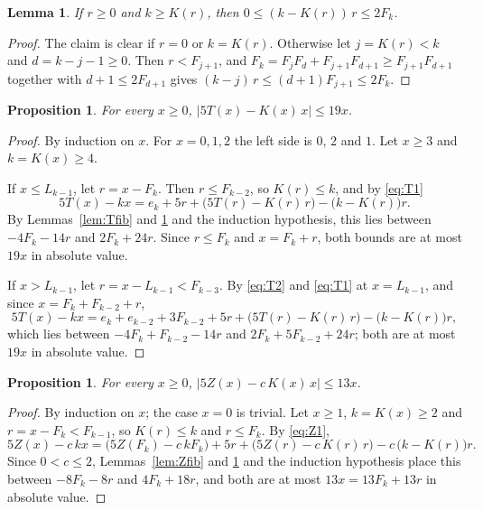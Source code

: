 \documentclass[]{interact}
\theoremstyle{plain}
\numberwithin{equation}{section}
\newtheorem{lemma}[thm]{Lemma}
\newtheorem{proposition}[thm]{Proposition}
\theoremstyle{definition}
\begin{document}
\begin{lemma}\label{lem:gap}
If $r\ge0$ and $k\ge K(r)$, then $0\le (k-K(r))\,r\le 2F_k$.
\end{lemma}

\begin{proof}
The claim is clear if $r=0$ or $k=K(r)$. Otherwise let $j=K(r)<k$ and $d=k-j-1\ge0$. Then $r<F_{j+1}$, and $F_{k}=F_{j}F_{d}+F_{j+1}F_{d+1}\ge F_{j+1}F_{d+1}$ together with $d+1\le 2F_{d+1}$ gives $(k-j)\,r\le(d+1)F_{j+1}\le 2F_k$.
\end{proof}

\begin{proposition}\label{prop:T}
For every $x\ge0$, $|5T(x)-K(x)\,x|\le19x$.
\end{proposition}

\begin{proof}
By induction on $x$. For $x=0,1,2$ the left side is $0$, $2$ and $1$. Let $x\ge3$ and $k=K(x)\ge4$.

If $x\le L_{k-1}$, let $r=x-F_k$. Then $r\le F_{k-2}$, so $K(r)\le k$, and by \eqref{eq:T1}
\[
5T(x)-kx=e_k+5r+\bigl(5T(r)-K(r)\,r\bigr)-\bigl(k-K(r)\bigr)r.
\]
By Lemmas~\ref{lem:Tfib} and \ref{lem:gap} and the induction hypothesis, this lies between $-4F_k-14r$ and $2F_k+24r$. Since $r\le F_k$ and $x=F_k+r$, both bounds are at most $19x$ in absolute value.

If $x>L_{k-1}$, let $r=x-L_{k-1}<F_{k-3}$. By \eqref{eq:T2} and \eqref{eq:T1} at $x=L_{k-1}$, and since $x=F_k+F_{k-2}+r$,
\[
5T(x)-kx=e_k+e_{k-2}+3F_{k-2}+5r+\bigl(5T(r)-K(r)\,r\bigr)-\bigl(k-K(r)\bigr)r,
\]
which lies between $-4F_k+F_{k-2}-14r$ and $2F_k+5F_{k-2}+24r$; both are at most $19x$ in absolute value.
\end{proof}

\begin{proposition}\label{prop:Z}
For every $x\ge0$, $|5Z(x)-c\,K(x)\,x|\le13x$.
\end{proposition}

\begin{proof}
By induction on $x$; the case $x=0$ is trivial. Let $x\ge1$, $k=K(x)\ge2$ and $r=x-F_k<F_{k-1}$, so $K(r)\le k$ and $r\le F_k$. By \eqref{eq:Z1},
\[
5Z(x)-c\,kx=\bigl(5Z(F_k)-c\,kF_k\bigr)+5r+\bigl(5Z(r)-c\,K(r)\,r\bigr)-c\,\bigl(k-K(r)\bigr)r.
\]
Since $0<c\le2$, Lemmas~\ref{lem:Zfib} and \ref{lem:gap} and the induction hypothesis place this between $-8F_k-8r$ and $4F_k+18r$, and both are at most $13x=13F_k+13r$ in absolute value.
\end{proof}
\end{document}
